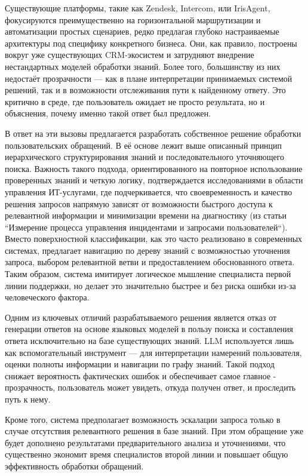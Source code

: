 Существующие платформы, такие как Zendesk, Intercom, или IrisAgent, фокусируются преимущественно на горизонтальной маршрутизации и автоматизации простых сценариев, редко предлагая глубоко настраиваемые архитектуры под специфику конкретного бизнеса. Они, как правило, построены вокруг уже существующих CRM-экосистем и затрудняют внедрение нестандартных моделей обработки знаний. Более того, большинству из них недостаёт прозрачности — как в плане интерпретации принимаемых системой решений, так и в возможности отслеживания пути к найденному ответу. Это критично в среде, где пользователь ожидает не просто результата, но и объяснения, почему именно такой ответ был предложен.

В ответ на эти вызовы предлагается разработать собственное решение обработки пользовательских обращений. В её основе лежит выше описанный принцип иерархического структурирования знаний и последовательного уточняющего поиска. Важность такого подхода, ориентированного на повторное использование проверенных знаний и четкую логику, подтверждается исследованиями в области управления ИТ-услугами, где подчеркивается, что своевременность и качество решения запросов напрямую зависят от возможности быстрого доступа к релевантной информации и минимизации времени на диагностику (из статьи ``Измерение процесса управления инцидентами и запросами пользователей``\cite{cleverics}). Вместо поверхностной классификации, как это часто реализовано в современных системах, предлагает навигацию по дереву знаний с возможностью уточнения запроса, выбором релевантной ветви и предоставлением обоснованного ответа. Таким образом, система имитирует логическое мышление специалиста первой линии поддержки, но делает это значительно быстрее и без риска ошибки из-за человеческого фактора.

Одним из ключевых отличий разрабатываемого решения является отказ от генерации ответов на основе языковых моделей в пользу поиска и составления ответа исключительно на базе существующих знаний. LLM используется лишь как вспомогательный инструмент — для интерпретации намерений пользователя, оценки полноты информации и навигации по графу знаний. Такой подход снижает вероятность фактических ошибок и обеспечивает самое главное - прозрачность, пользователь может увидеть, откуда получен ответ, и проследить путь к нему.

Кроме того, система предполагает возможность эскалации запроса только в случае отсутствия релевантного решения в базе знаний. При этом обращение уже будет дополнено результатами предварительного анализа и уточнениями, что существенно экономит время специалистов второй линии и повышает общую эффективность обработки обращений.

